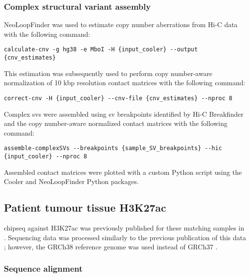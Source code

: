 \subsubsection{Complex structural variant assembly}

NeoLoopFinder \cite{wangGenomewideDetectionEnhancerhijacking2021} was used to estimate copy number aberrations from Hi-C data with the following command:

\begin{lstlisting}[basicstyle=\ttfamily]
calculate-cnv -g hg38 -e MboI -H {input_cooler} --output {cnv_estimates}
\end{lstlisting}

This estimation was subsequently used to perform copy number-aware normalization of 10 kbp resolution contact matrices with the following command:

\begin{lstlisting}[basicstyle=\ttfamily]
correct-cnv -H {input_cooler} --cnv-file {cnv_estimates} --nproc 8
\end{lstlisting}

Complex \glspl{sv} were assembled using \gls{sv} breakpoints identified by Hi-C Breakfinder \cite{dixonIntegrativeDetectionAnalysis2018} and the copy number-aware normalized contact matrices with the following command:

\begin{lstlisting}[basicstyle=\ttfamily]
assemble-complexSVs --breakpoints {sample_SV_breakpoints} --hic {input_cooler} --nproc 8
\end{lstlisting}

Assembled contact matrices were plotted with a custom Python script using the Cooler and NeoLoopFinder Python packages.

\subsection{Patient tumour tissue H3K27ac }

\gls{chipseq} against H3K27ac was previously published for these matching samples in \cite{kronTMPRSS2ERGFusion2017}.
Sequencing data was processed similarly to the previous publication of this data \cite{kronTMPRSS2ERGFusion2017}; however, the GRCh38 reference genome was used instead of GRCh37 \cite{internationalhumangenomesequencingconsortiumFinishingEuchromaticSequence2004}.

\subsubsection{Sequence alignment}

